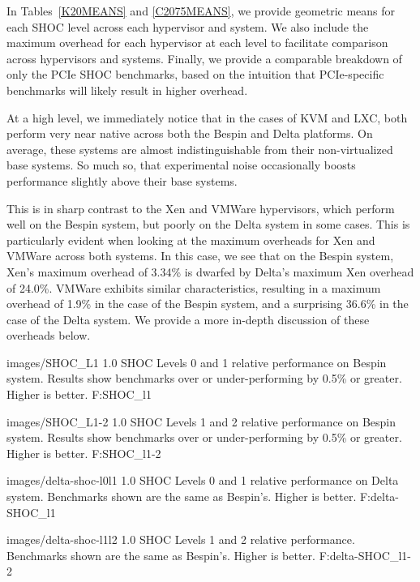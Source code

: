 

In Tables~\ref{K20MEANS} and \ref{C2075MEANS}, we provide geometric means for each SHOC level across each
hypervisor and system.  We also include the maximum
overhead for each hypervisor at each level to facilitate comparison across
hypervisors and systems.  Finally, we provide a comparable breakdown of only the
PCIe SHOC benchmarks, based on the intuition that PCIe-specific benchmarks will
likely result in higher overhead.  

At a high level, we immediately notice that in the cases of KVM and LXC, both
perform very near native across both the Bespin and Delta platforms.  On
average, these systems are almost indistinguishable from their non-virtualized
base systems.  So much so, that experimental noise occasionally boosts
performance slightly above their base systems.  

This is in sharp contrast to the Xen and VMWare hypervisors, which perform well
on the Bespin system, but poorly on the Delta system in some cases.  This is
particularly evident when looking at the maximum overheads for Xen and VMWare
across both systems.  In this case, we see that on the Bespin system, Xen's
maximum overhead of 3.34\% is dwarfed by Delta's maximum Xen overhead of 24.0\%.
VMWare exhibits similar characteristics, resulting in a maximum overhead of
1.9\% in the case of the Bespin system, and a surprising 36.6\% in the case of
the Delta system.  We provide a more in-depth discussion of these overheads
below.


  {images/SHOC_L1}
  {1.0}
  {SHOC Levels 0 and 1 relative performance on Bespin system.  Results show benchmarks over or
under-performing by 0.5\% or greater.  Higher is better.}
  {F:SHOC_l1} 

  {images/SHOC_L1-2}
  {1.0}
  {SHOC Levels 1 and 2 relative performance on Bespin system.  Results show benchmarks over or
under-performing by 0.5\% or greater.  Higher is better.}
  {F:SHOC_l1-2} 

  {images/delta-shoc-l0l1}
  {1.0}
  {SHOC Levels 0 and 1 relative performance on Delta system.  Benchmarks
shown are the same as Bespin's.  Higher is better.}
  {F:delta-SHOC_l1} 

  {images/delta-shoc-l1l2}
  {1.0}
  {SHOC Levels 1 and 2 relative performance. Benchmarks shown are the same as
Bespin's.   Higher is better.}
  {F:delta-SHOC_l1-2} 



